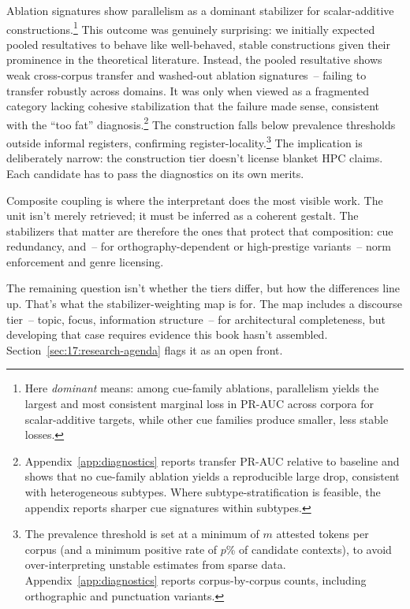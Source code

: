 Ablation signatures show parallelism as a dominant stabilizer for scalar-additive constructions.\footnote{Here \emph{dominant} means: among cue-family ablations, parallelism yields the largest and most consistent marginal loss in PR-AUC across corpora for scalar-additive targets, while other cue families produce smaller, less stable losses.}
This outcome was genuinely surprising: we initially expected pooled resultatives to behave like well-behaved, stable constructions given their prominence in the theoretical literature. Instead, the pooled resultative shows weak cross-corpus transfer and washed-out ablation signatures~-- failing to transfer robustly across domains. It was only when viewed as a fragmented category lacking cohesive stabilization that the failure made sense, consistent with the \enquote{too fat} diagnosis.\footnote{Appendix~\ref{app:diagnostics} reports transfer PR-AUC relative to baseline and shows that no cue-family ablation yields a reproducible large drop, consistent with heterogeneous subtypes. Where subtype-stratification is feasible, the appendix reports sharper cue signatures within subtypes.}
The  construction falls below prevalence thresholds outside informal registers, confirming register-locality.\footnote{The prevalence threshold is set at a minimum of $m$ attested tokens per corpus (and a minimum positive rate of $p$\% of candidate contexts), to avoid over-interpreting unstable estimates from sparse data. Appendix~\ref{app:diagnostics} reports corpus-by-corpus counts, including orthographic and punctuation variants.}
The implication is deliberately narrow: the construction tier doesn't license blanket HPC claims. Each candidate has to pass the diagnostics on its own merits.

Composite coupling is where the interpretant does the most visible work. The unit isn't merely retrieved; it must be inferred as a coherent gestalt. The stabilizers that matter are therefore the ones that protect that composition: cue redundancy, and~-- for orthography-dependent or high-prestige variants~-- norm enforcement and genre licensing.

The remaining question isn't whether the tiers differ, but how the differences line up. That's what the stabilizer-weighting map is for. The map includes a discourse tier~-- topic, focus, information structure~-- for architectural completeness, but developing that case requires evidence this book hasn't assembled. Section~\ref{sec:17:research-agenda} flags it as an open front.


